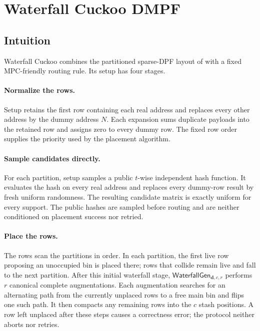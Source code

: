 \section{Waterfall Cuckoo DMPF}\label{sec:waterfallCuckoo}

\subsection{Intuition}\label{sec:waterfallCuckooIntuition}

Waterfall Cuckoo combines the partitioned sparse-DPF layout of
 with a fixed MPC-friendly routing rule.  Its setup has
four stages.

\paragraph{Normalize the rows.}
Setup retains the first row containing each real address and replaces every
other address by the dummy address $N$.  Each expansion sums duplicate
payloads into the retained row and assigns zero to every dummy row.  The fixed
row order supplies the priority used by the placement algorithm.

\paragraph{Sample candidates directly.}
For each partition, setup samples a public $t$-wise independent hash function.
It evaluates the hash on every real address and replaces every dummy-row result
by fresh uniform randomness.  The resulting candidate matrix is exactly
uniform for every support. The public hashes are sampled before routing and
are neither conditioned on placement success nor retried.

\paragraph{Place the rows.}
The rows scan the partitions in order.  In each partition, the first live row
proposing an unoccupied bin is placed there; rows that collide remain live and
fall to the next partition.  After this initial waterfall stage,
$\mathsf{WaterfallGen}_{\mathbf d,c,r}$ performs $r$ canonical complete
augmentations.  Each augmentation searches for an alternating path from the
currently unplaced rows to a free main bin and flips one such path.
It then compacts any remaining rows into
the $c$ stash positions.  A row left unplaced after these steps causes a
correctness error; the protocol neither aborts nor retries.

